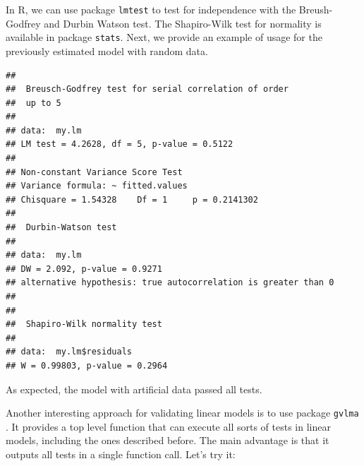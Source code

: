\documentclass[11pt,]{book}
\newenvironment{Shaded}{\begin{snugshade}}{\end{snugshade}}
\newcommand{\KeywordTok}[1]{\textcolor[rgb]{0.27,0.27,0.27}{\textbf{#1}}}
\newcommand{\DataTypeTok}[1]{\textcolor[rgb]{0.27,0.27,0.27}{#1}}
\newcommand{\DecValTok}[1]{\textcolor[rgb]{0.06,0.06,0.06}{#1}}
\newcommand{\CommentTok}[1]{\textcolor[rgb]{0.56,0.35,0.01}{\textit{#1}}}
\newcommand{\OperatorTok}[1]{\textcolor[rgb]{0.81,0.36,0.00}{\textbf{#1}}}
\newcommand{\NormalTok}[1]{#1}
\begin{document}
In R, we can use package \texttt{lmtest} \citep{lmtest} to test for
independence with the Breush-Godfrey and Durbin Watson test. The
Shapiro-Wilk test for normality is available in package \texttt{stats}.
Next, we provide an example of usage for the previously estimated model
with random data.

\begin{Shaded}
\end{Shaded}

\begin{verbatim}
## 
##  Breusch-Godfrey test for serial correlation of order
##  up to 5
## 
## data:  my.lm
## LM test = 4.2628, df = 5, p-value = 0.5122
## 
## Non-constant Variance Score Test 
## Variance formula: ~ fitted.values 
## Chisquare = 1.54328    Df = 1     p = 0.2141302 
## 
##  Durbin-Watson test
## 
## data:  my.lm
## DW = 2.092, p-value = 0.9271
## alternative hypothesis: true autocorrelation is greater than 0
## 
## 
##  Shapiro-Wilk normality test
## 
## data:  my.lm$residuals
## W = 0.99803, p-value = 0.2964
\end{verbatim}

As expected, the model with artificial data passed all tests.

Another interesting approach for validating linear models is to use
package \texttt{gvlma} \citep{gvlma}. It provides a top level function
that can execute all sorts of tests in linear models, including the ones
described before. The main advantage is that it outputs all tests in a
single function call. Let's try it:
\end{document}
